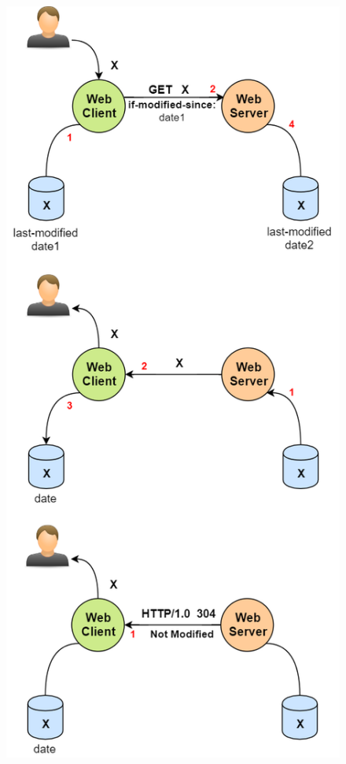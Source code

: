 \begin{itemize}
{\begin{figure}[h]
\includegraphics[scale=0.5]{Images/HTTP/if_cache}
\end{figure}
}
\end{itemize}
\clearpage
